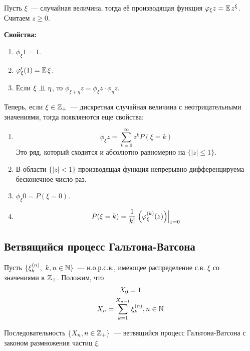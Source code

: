 \begin{definition} 
Пусть $\xi$~--- случайная величина, тогда её производящая функция $\varphi_{\xi}{z} = \operatorname{\mathbb{E}} z^{\xi}$. Считаем $z \geq 0$.
\end{definition}

\textbf{Свойства:}
\begin{enumerate}
    \item $\phi_{\xi}{1} = 1$.
    \item $\varphi_{\xi}'(1) = \operatorname{\mathbb{E}}\xi$.
    \item Если $\xi \perp \!\!\! \perp \eta$, то $\phi_{\xi + \eta}{z} = \phi_{\xi}{z} \cdot \phi_{\eta}{z}$.
\end{enumerate}

Теперь, если $\xi \in \mathbb{Z}_+$~--- дискретная случайная величина с неотрицательными значениями, тогда появляеются еще свойства:
\begin{enumerate}
    \item[4.] 
    \begin{equation*}
        \phi_{\xi}{z} = \sum\limits_{k = 0}^\infty z^k P(\xi = k)
    \end{equation*}
    Это ряд, который сходится и абсолютно равномерно на $\{|z| \leq 1\}$.
    \item[5.] В области $\{|z| < 1\}$ производящая функция непрерывно дифференцируема бесконечное число раз.
    \item[6.] $\phi_{\xi}{0} = P(\xi = 0)$.
    \item[7.]
    \begin{equation*}
        P(\xi = k) = \frac{1}{k!} \left.\left({\varphi_{\xi}^{(k)}(z)}\right)\right\vert_{z = 0}
    \end{equation*}
\end{enumerate}

\subsection{Ветвящийся процесс Гальтона-Ватсона}

Пусть $\{\xi_k^{(n)}, \ k, n \in \mathbb{N}\}$~--- н.о.р.с.в., имеющее распределение с.в. $\xi$ со значениями в $\mathbb{Z}_+$. Положим, что
\begin{gather*}
    X_0 = 1 \\
    X_n = \sum\limits_{k = 1}^{X_{n - 1}} \xi_k^{(n)}, n \in \mathbb{N}
\end{gather*}

\begin{definition}
Последовательность $\{X_n, n \in \mathbb{Z}_+\}$~--- ветвящийся процесс Гальтона-Ватсона с законом размножения частиц $\xi$. 
\end{definition}

